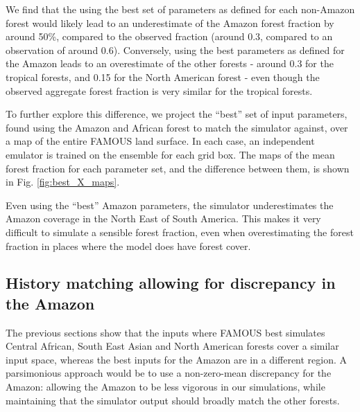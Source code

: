 \documentclass[esd, article]{copernicus} %
\begin{document}
We find that the using the best set of parameters as defined for each non-Amazon forest would likely lead to an underestimate of the Amazon forest fraction by around 50\%, compared to the observed fraction (around 0.3, compared to an observation of around 0.6). Conversely, using the best parameters as defined for the Amazon leads to an overestimate of the other forests - around 0.3 for the tropical forests, and 0.15 for the North American forest - even though the observed aggregate forest fraction is very similar for the tropical forests.


To further explore this difference, we project the ``best'' set of input parameters, found using the Amazon and African forest to match the simulator against, over a map of the entire FAMOUS land surface. In each case, an independent emulator is trained on the ensemble for each grid box. The maps of the mean forest fraction for each parameter set, and the difference between them, is shown in Fig.  \ref{fig:best_X_maps}.

Even using the ``best'' Amazon parameters, the simulator underestimates the Amazon coverage in the North East of South America. This makes it very difficult to simulate a sensible forest fraction, even when overestimating the forest fraction in places where the model does have forest cover.

\subsection{History matching allowing for discrepancy in the Amazon}\label{ssec:hist_disc}

The previous sections show that the inputs where FAMOUS best simulates Central African, South East Asian and North American forests cover a similar input space, whereas the best inputs for the Amazon are in a different region. A parsimonious approach would be to use a non-zero-mean discrepancy for the Amazon: allowing the Amazon to be less vigorous in our simulations, while maintaining that the simulator output should broadly match the other forests.
\end{document}
